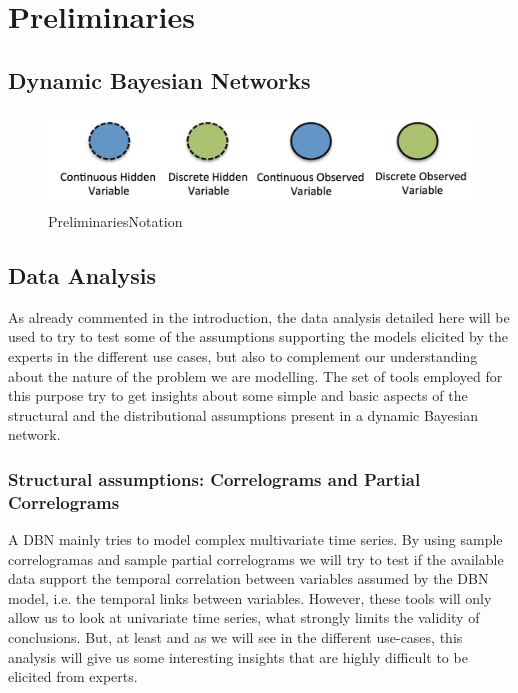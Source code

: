 \section{Preliminaries}\label{Section:Preliminaries}


\subsection{Dynamic Bayesian Networks}



\begin{figure}
\begin{center}
\includegraphics[scale=0.4]{./figures/PreliminariesNotation}
\caption{\label{Figure:PreliminariesNotation}PreliminariesNotation
}
\end{center}
\end{figure}





\subsection{Data Analysis}

As already commented in the introduction, the data analysis detailed here will be used to try to test some of the assumptions supporting the models elicited by the experts in the different use cases, but also to complement our understanding about the nature of the problem we are modelling. The set of tools employed for this purpose try to get insights about some simple and basic aspects of the structural and the distributional assumptions present in a dynamic Bayesian network.


\subsubsection*{Structural assumptions:  Correlograms and Partial Correlograms}

A DBN mainly tries to model complex multivariate time series. By using sample correlogramas and sample partial correlograms we will try to test if the available data support the temporal correlation between variables assumed by the DBN model, i.e. the temporal links between variables. However, these tools will only allow us to look at univariate time series, what strongly limits the validity of  conclusions. But, at least and as we will see in the different use-cases, this analysis will give us some interesting insights that are highly difficult to be elicited from experts.  


